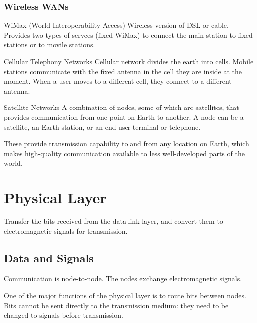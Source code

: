 \documentclass[\main/notes.tex]{subfiles}
\begin{document}
				\subsubsection{Wireless WANs}
					\begin{definition}{WiMax (World Interoperability Access)}
						Wireless version of DSL or cable. Provides two types of servces (fixed WiMax) to connect the main station to fixed stations or to movile stations.
					\end{definition}
					\begin{definition}{Cellular Telephony Networks}
						Cellular network divides the earth into cells. Mobile stations communicate with the fixed antenna in the cell they are inside at the moment. When a user moves to a different cell, they connect to a different antenna.
					\end{definition}
					\begin{definition}{Satellite Networks}
						A combination of nodes, some of which are satellites, that provides communication from one point on Earth to another. A node can be a satellite, an Earth station, or an end-user terminal or telephone.

						These provide transmission capability to and from any location on Earth, which makes high-quality communication available to less well-developed parts of the world.
					\end{definition}

		\section{Physical Layer}
			Transfer the bits received from the data-link layer, and convert them to electromagnetic signals for transmission.
			\subsection{Data and Signals}
				Communication is node-to-node. The nodes exchange electromagnetic signals.

				One of the major functions of the physical layer is to route bits between nodes. Bits cannot be sent directly to the transmission medium: they need to be changed to signals before transmission. 
\end{document}
